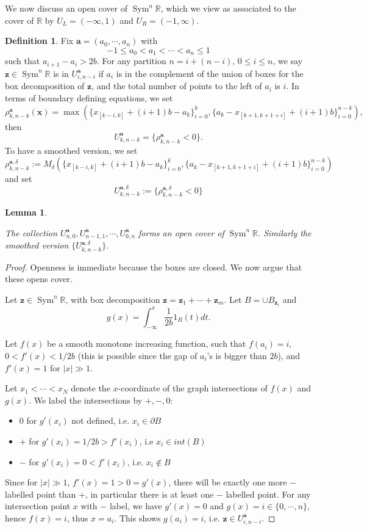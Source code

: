 \documentclass{article}
\def\R{\mathbb{R}}
\def\C{\mathbb{C}}
\def\d{\partial}
\DeclareMathOperator{\Sym}{Sym}
\def\bz{\mathbf{z}} %
\def\bx{\mathbf{x}} %
\def\ba{\mathbf{a}} %
\newtheorem{lemma}[theorem]{Lemma}
\theoremstyle{definition}
\newtheorem{definition}
[theorem]{Definition}
\begin{document}
 

We now discuss an open cover of $\Sym^n \R$, which we view as associated to the cover of $\R$ by $U_L = (-\infty,1)$ and $U_R = (-1, \infty)$. 

\begin{definition} \label{def: box opens}
Fix $\ba=(a_0, \cdots, a_n)$ with
$$ -1 \leq a_0 < a_1 < \cdots < a_n \leq 1 $$
such that $a_{i+1}-a_i > 2b$. 
For any partition $n= i + (n-i)$, $0 \leq i \leq n$, we say $\bz \in \Sym^n \R$ is in $U^{\ba}_{i, n - i}$ if $a_{i}$ 
is in the complement of the union of boxes for the box decomposition of $\bz$, and the total number of points to the left of $a_i$ is $i$. In terms of boundary defining equations, we set $$ \rho^{\ba}_{k,n-k}(\bx) = \max( \{ x_{[k-i,k]} + (i+1)b - a_k\}_{i=0}^k, \{a_k - x_{[k+1,k+1+i]} + (i+1)b\}_{i=0}^{n-k}), $$ then $$ U^{\ba}_{k,n-k}=\{\rho^{\ba}_{k,n-k} < 0\}. $$
To have a smoothed version, we set $$ \rho^{\ba, \delta}_{k,n-k} := M_\delta( \{ x_{[k-i,k]} + (i+1)b - a_k\}_{i=0}^k, \{a_k - x_{[k+1,k+1+i]} + (i+1)b\}_{i=0}^{n-k}) $$
        and set 
        $$ U^{\ba, \delta}_{k,n-k} := \{\rho^{\ba, \delta}_{k,n-k} < 0 \} $$
\end{definition}



\begin{lemma} \label{box opens cover}
    
    The collection $U^\ba_{n,0}, U^\ba_{n-1,1}, \cdots, U^\ba_{0,n}$ forms an open cover of $\Sym^n \R$. Similarly the smoothed version $\{U^{\ba,\delta}_{k,n-k}\}$. 
\end{lemma}
\begin{proof}
Openness is immediate because the boxes are closed.  We now argue that these opens cover.

Let $\bz \in \Sym^n \R$, with box decomposition $\bz = \bz_1 + \cdots + \bz_m$.  Let $B = \cup B_{\bz_i}$ and
$$ g(x) = \int_{-\infty}^x \frac{1}{2b} 1_B(t) dt. $$

Let $f(x)$ be a smooth monotone increasing function, such that $f(a_i)=i$,  $0< f'(x) < 1/2b$ (this is possible since the gap of $a_i$'s is bigger than $2b$), and $f'(x)=1$ for $|x| \gg 1$. 

Let $x_1< \cdots< x_N$ denote the $x$-coordinate of the graph intersections of $f(x)$ and $g(x)$.  We label the intersections by $+, -, 0$: 
\begin{itemize}
    \item $0$ for $g'(x_i)$ not defined, i.e. $x_i \in \d B$
    \item  $+$ for $g'(x_i) = 1/2b > f'(x_i)$, i.e  $x_i \in int(B)$
    \item $-$ for $g'(x_i) =0 < f'(x_i)$, i.e. $x_i \notin B$
\end{itemize}
Since for $|x| \gg 1$, $f'(x) = 1 > 0 = g'(x)$, there will be exactly one more $-$ labelled point than $+$, in particular there is at least one $-$ labelled point. For any intersection point $x$ with $-$ label, we have $g'(x)=0$ and $g(x) = i \in \{0, \cdots, n\}$, hence $f(x)=i$, thus $x=a_i$. This shows $g(a_i) = i$, i.e. $\bz \in U^\ba_{i,n-i}$. 
\end{proof}
\end{document}
